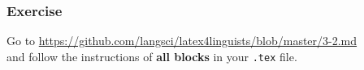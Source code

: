 \begin{frame}[fragile]
\frametitle{Exercise}


Go to \url{https://github.com/langsci/latex4linguists/blob/master/3-2.md}\\
and follow the instructions of \textbf{all blocks} in your \texttt{.tex} file.


\end{frame}


%
%
%


%
%	
%
%
%

